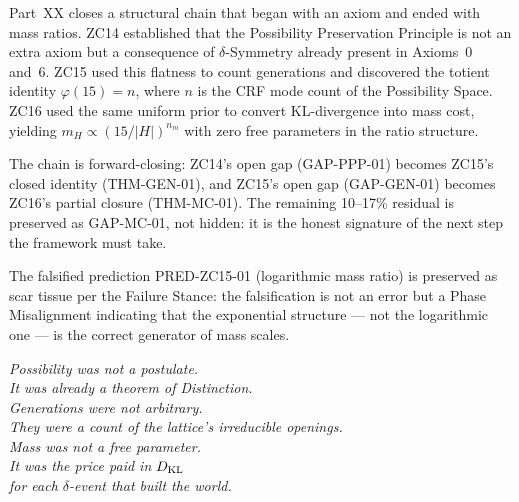 \documentclass[12pt, a4paper]{article}
\begin{document}
Part~XX closes a structural chain that began with an axiom and ended
with mass ratios. ZC14 established that the Possibility Preservation
Principle is not an extra axiom but a consequence of $\delta$-Symmetry
already present in Axioms~0 and~6. ZC15 used this flatness to count
generations and discovered the totient identity $\varphi(15) = n$,
where $n$ is the CRF mode count of the Possibility Space. ZC16 used
the same uniform prior to convert KL-divergence into mass cost,
yielding $m_H \propto (15/|H|)^{n_m}$ with zero free parameters in
the ratio structure.

The chain is forward-closing: ZC14's open gap (GAP-PPP-01)
becomes ZC15's closed identity (THM-GEN-01), and ZC15's open gap
(GAP-GEN-01) becomes ZC16's partial closure (THM-MC-01). The
remaining 10--17\% residual is preserved as GAP-MC-01, not hidden:
it is the honest signature of the next step the framework must take.

The falsified prediction PRED-ZC15-01 (logarithmic mass ratio) is
preserved as scar tissue per the Failure Stance: the falsification
is not an error but a Phase Misalignment indicating that the
exponential structure --- not the logarithmic one --- is the correct
generator of mass scales.

\begin{center}
\textit{Possibility was not a postulate.\\
It was already a theorem of Distinction.\\
Generations were not arbitrary.\\
They were a count of the lattice's irreducible openings.\\
Mass was not a free parameter.\\
It was the price paid in $D_{\rm KL}$\\
for each $\delta$-event that built the world.}
\end{center}

\end{document}
